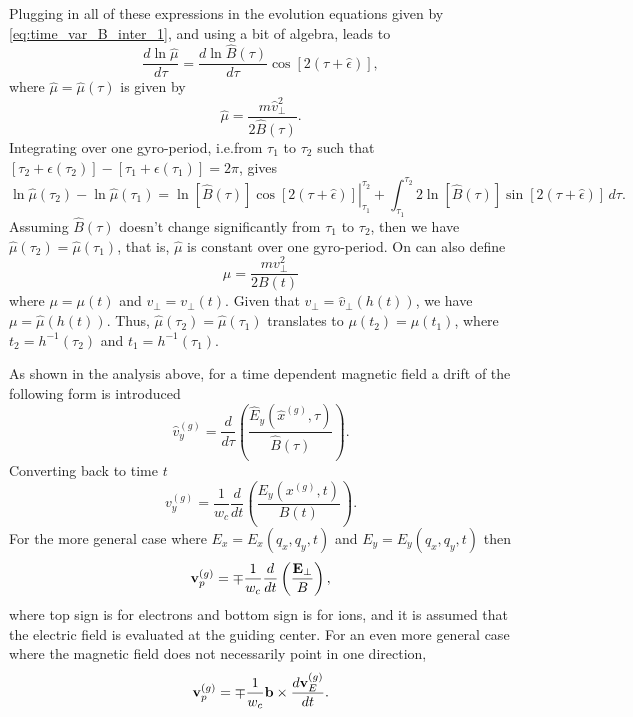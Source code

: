 \documentclass[a4paper,11pt]{report}
\begin{document}
Plugging in all of these expressions in the evolution equations given by \cref{eq:time_var_B_inter_1}, and using a bit of algebra, leads to
\begin{equation}
\frac{d \ln \hat{\mu}}{d\tau} = \frac{d \ln \hat{B}(\tau)}{d\tau} \cos [ 2 (\tau + \hat{\epsilon}) ],
\end{equation}
where $\hat{\mu} = \hat{\mu}(\tau)$ is given by
\begin{equation}
    \hat{\mu} = \frac{m \hat{v}_\perp^2}{2\hat{B}(\tau)}.
\end{equation}
Integrating over one gyro-period, i.e.\@ from $\tau_1$ to $\tau_2$ such that $[\tau_2 + \epsilon(\tau_2)] - [\tau_1 + \epsilon(\tau_1)] = 2\pi$, gives
\begin{equation}
    \ln \hat{\mu}(\tau_2) - \ln \hat{\mu}(\tau_1) = \left. \ln [\hat{B}(\tau)] \cos [2 (\tau+\hat{\epsilon})] \right |_{\tau_1}^{\tau_2} + \int_{\tau_1}^{\tau_2} 2 \ln [\hat{B}(\tau)] \sin[2(\tau+\hat{\epsilon})] \, d\tau.
\end{equation}
Assuming $\hat{B}(\tau)$ doesn't change significantly from $\tau_1$ to $\tau_2$, then we have $\hat{\mu}(\tau_2) = \hat{\mu}(\tau_1)$, that is, $\hat{\mu}$ is constant over one gyro-period. On can also define
\begin{equation}
    \mu = \frac{m v_\perp^2}{2 B(t)}
\end{equation}
where $\mu = \mu(t)$ and $v_\perp = v_\perp(t)$. Given that $v_\perp = \hat{v}_\perp(h(t))$, we have $\mu = \hat{\mu}(h(t))$. Thus, $\hat{\mu}(\tau_2) = \hat{\mu}(\tau_1)$ translates to $\mu(t_2) = \mu(t_1)$, where $t_2 = h^{-1}(\tau_2)$ and $t_1 = h^{-1}(\tau_1)$.

As shown in the analysis above, for a time dependent magnetic field a drift of the following form is introduced
\begin{equation}
    \hat{v}^{(g)}_y = \frac{d}{d\tau} \left ( \frac{\hat{E}_y(\hat{x}^{(g)},\tau)}{\hat{B}(\tau)} \right ).
\end{equation}
Converting back to time $t$
\begin{equation}
    v^{(g)}_y = \frac{1}{w_c} \frac{d}{dt} \left ( \frac{E_y(x^{(g)},t)}{B(t)} \right ).
\end{equation}
For the more general case where $E_x = E_x(q_x,q_y,t)$ and $E_y = E_y(q_x,q_y,t)$ then
\begin{equation}
    \mathbf{v}^{(g)}_p = \mp \frac{1}{w_c} \frac{d}{dt} \left ( \frac{\mathbf{E}_\perp}{B} \right ),
\end{equation}
where top sign is for electrons and bottom sign is for ions, and it is assumed that the electric field is evaluated at the guiding center. For an even more general case where the magnetic field does not necessarily point in one direction,
\begin{equation}
    \mathbf{v}^{(g)}_p = \mp \frac{1}{w_c} \mathbf{b} \times \frac{d\mathbf{v}^{(g)}_E}{dt}.
\end{equation}
\end{document}

